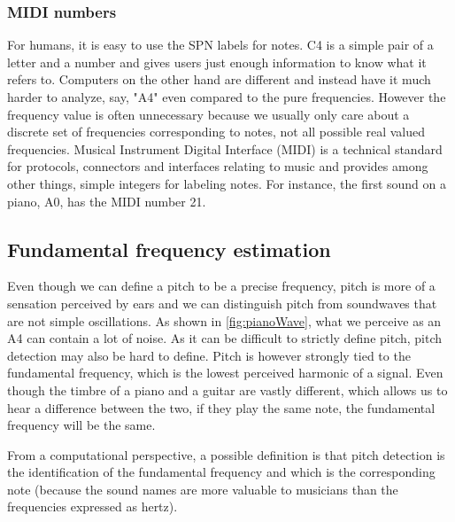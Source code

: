 \subsubsection{MIDI numbers}
For humans, it is easy to use the SPN labels for notes. C4 is a simple pair of a letter and a number and gives users just enough information to know what it refers to. Computers on the other hand are different and instead have it much harder to analyze, say, "A4" even compared to the pure frequencies. However the frequency value is often unnecessary because we usually only care about a discrete set of frequencies corresponding to notes, not all possible real valued frequencies. 
Musical Instrument Digital Interface (MIDI) is a technical standard for protocols, connectors and interfaces relating to music and provides among other things, simple integers for labeling notes. For instance, the first sound on a piano, A0, has the MIDI number 21. 


% 
\subsection{Fundamental frequency estimation}
Even though we can define a pitch to be a precise frequency, pitch is more of a sensation perceived by ears and we can distinguish pitch from soundwaves that are not simple oscillations. As shown in \ref{fig:pianoWave}, what we perceive as an A4 can contain a lot of noise. As it can be difficult to strictly define pitch, pitch detection may also be hard to define. Pitch is however strongly tied to the fundamental frequency, which is the lowest perceived harmonic of a signal. Even though the timbre of a piano and a guitar are vastly different, which allows us to hear a difference between the two, if they play the same note, the fundamental frequency will be the same. 

From a computational perspective, a possible definition is that pitch detection is the identification of the fundamental frequency and which is the corresponding note (because the sound names are more valuable to musicians than the frequencies expressed as hertz). 

